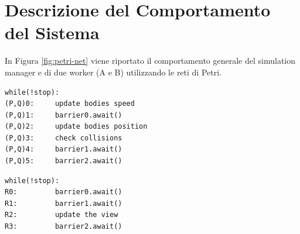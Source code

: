 \documentclass[12pt,a4paper,openright,twoside]{book}
\begin{document}
\chapter{Descrizione del Comportamento del Sistema} %
\label{chap:Descrizione del Comportamento del Sistema}
In Figura \ref{fig:petri-net} viene riportato il comportamento generale del simulation manager e di due worker (A e B) utilizzando 
le reti di Petri.
\begin{lstlisting}[label=lst:worker,caption=pseudocodice del worker]
		while(!stop):
(P,Q)0:		update bodies speed
(P,Q)1:		barrier0.await()
(P,Q)2:		update bodies position
(P,Q)3:		check collisions
(P,Q)4:		barrier1.await()
(P,Q)5:		barrier2.await()
\end{lstlisting}

\begin{lstlisting}[label=lst:simulation_manager,caption=pseudocodice del simulation manager]
		while(!stop):
R0:			barrier0.await()
R1:			barrier1.await()
R2:			update the view
R3:			barrier2.await()
\end{lstlisting}
\end{document}
